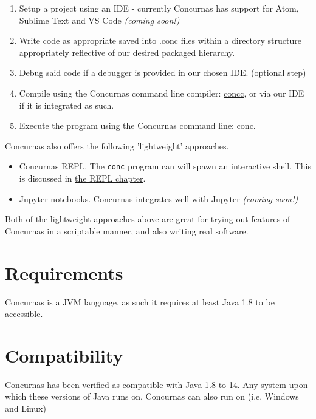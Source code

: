 \documentclass[conc-doc]{subfiles}
\begin{document}
\begin{enumerate}
	\item Setup a project using an IDE - currently Concurnas has support for Atom, Sublime Text and VS Code  \textit{(coming soon!)}
	\item Write code as appropriate saved into .conc files within a directory structure appropriately reflective of our desired packaged hierarchy.
	\item Debug said code if a debugger is provided in our chosen IDE. (optional step)
	\item Compile using the Concurnas command line compiler: \hyperref[ch:concc]{concc}, or via our IDE if it is integrated as such.
	\item Execute the program using the Concurnas command line: conc.
\end{enumerate}

Concurnas also offers the following 'lightweight' approaches.

\begin{itemize}
	\item Concurnas REPL. The \lstinline{conc} program can will spawn an interactive shell. This is discussed in \hyperref[ch:repl]{the REPL chapter}.
	\item Jupyter notebooks. Concurnas integrates well with Jupyter\textit{ (coming soon!)}
\end{itemize}

Both of the lightweight approaches above are great for trying out features of Concurnas in a scriptable manner, and also writing real software.


\section{Requirements}
Concurnas is a JVM language, as such it requires at least Java 1.8 to be accessible.

\section{Compatibility}
Concurnas has been verified as compatible with Java 1.8 to 14. Any system upon which these versions of Java runs on,  Concurnas can also run on (i.e. Windows and Linux)
\end{document}
